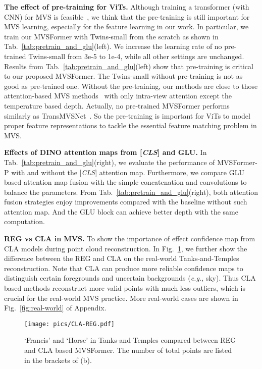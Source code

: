 \documentclass[10pt]{article} \usepackage[preprint]{tmlr}
\begin{document}
\noindent\textbf{The effect of pre-training for ViTs.} 
Although training a transformer (with CNN) for MVS is feasible~\citep{zhu2021multi}, we think that the pre-training is still important for MVS learning, especially for the feature learning in our work. In particular, we train our MVSFormer with Twins-small from the scratch as shown in Tab.~\ref{tab:pretrain_and_glu}(left). We increase the learning rate of no pre-trained Twins-small from 3e-5 to 1e-4, while all other settings are unchanged. Results from Tab.~\ref{tab:pretrain_and_glu}(left) show that pre-training is critical to our proposed MVSFormer. The Twins-small without pre-training is not as good as pre-trained one.
Without the pre-training, our methods are close to those attention-based MVS methods~\citep{ding2021transmvsnet,zhu2021multi} with only intra-view attention except the temperature based depth. Actually, no pre-trained MVSFormer performs similarly as TransMVSNet~\citep{ding2021transmvsnet}. So the pre-training is important for ViTs to model proper feature representations to tackle the essential feature matching problem in MVS.



\noindent\textbf{Effects of DINO attention maps from [\emph{CLS}] and GLU.}
In Tab.~\ref{tab:pretrain_and_glu}(right), we evaluate the performance of MVSFormer-P with and without the [\emph{CLS}] attention map. Furthermore, we compare GLU based attention map fusion with the simple concatenation and  convolutions to balance the parameters. 
From Tab.~\ref{tab:pretrain_and_glu}(right), both attention fusion strategies enjoy improvements compared with the baseline without such attention map. And the GLU block can achieve better depth with the same computation.



\noindent\textbf{REG vs CLA in MVS.} 
To show the importance of effect confidence map from CLA models during  point cloud reconstruction.
In Fig.~\ref{fig:tnt_cla_reg}, we further show the difference between the REG and CLA on the real-world Tanks-and-Temples reconstruction.
Note that CLA can produce more reliable confidence maps to distinguish certain foregrounds and uncertain backgrounds (\emph{e.g.}, sky). Thus CLA based methods reconstruct more valid points with much less outliers, which is crucial for the real-world MVS practice. More real-world cases are shown in Fig.~\ref{fig:real-world} of Appendix.
 
\begin{figure}
\begin{centering}
\texttt{[image: pics/CLA-REG.pdf]} 
\par\end{centering}
\caption{`Francis' and `Horse' in Tanks-and-Temples compared between REG and CLA based MVSFormer. The number of total points are listed in the brackets of (b).
}
\label{fig:tnt_cla_reg}
\vspace{-0.1in}
\end{figure}
\end{document}
